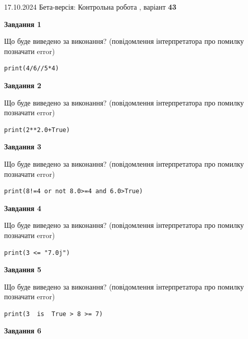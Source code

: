 \documentclass[12pt, ukrainian]{article}
\begin{document}
{\Large{17.10.2024 Бета-версія: Контрольна робота , варіант  \No \textbf { 43 }\par}}
{
\begin {large}
{\begin {center}\textbf{Завдання 1}\end {center}}

Що буде виведено за виконання? (повідомлення інтерпретатора про помилку позначати error)\par
\begin{verbatim}
print(4/6//5*4)
\end{verbatim}

{\begin {center}\textbf{Завдання 2}\end {center}}

Що буде виведено за виконання? (повідомлення інтерпретатора про помилку позначати error)\par
\begin{verbatim}
print(2**2.0+True)
\end{verbatim}

{\begin {center}\textbf{Завдання 3}\end {center}}

Що буде виведено за виконання? (повідомлення інтерпретатора про помилку позначати error)\par
\begin{verbatim}
print(8!=4 or not 8.0>=4 and 6.0>True)
\end{verbatim}

{\begin {center}\textbf{Завдання 4}\end {center}}

Що буде виведено за виконання? (повідомлення інтерпретатора про помилку позначати error)\par
\begin{verbatim}
print(3 <= "7.0j")
\end{verbatim}

{\begin {center}\textbf{Завдання 5}\end {center}}

Що буде виведено за виконання? (повідомлення інтерпретатора про помилку позначати error)\par
\begin{verbatim}
print(3  is  True > 8 >= 7)
\end{verbatim}

{\begin {center}\textbf{Завдання 6}\end {center}}


\end{large}}
\end{document}
